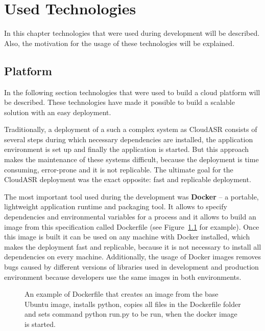 \chapter{Used Technologies}\label{sec:technologies}
In this chapter technologies that were used during development will be described.
Also, the motivation for the usage of these technologies will be explained.

\section{Platform}
In the following section technologies that were used to build a cloud platform will be described.
These technologies have made it possible to build a scalable solution with an easy deployment.

Traditionally, a deployment of a such a complex system as CloudASR consists of several steps
  during which necessary dependencies are installed,
  the application environment is set up
  and finally the application is started.
But this approach makes the maintenance of these systems difficult,
  because the deployment is time consuming, error-prone and it is not replicable.
The ultimate goal for the CloudASR deployment was the exact opposite: fast and replicable deployment.

The most important tool used during the development was \textbf{Docker} \cite{merkel2014docker}
  -- a portable, lightweight application runtime and packaging tool.
It allows to specify dependencies and environmental variables for a process
  and it allows to build an image from this specification called Dockerfile
  (see Figure~\ref{fig:dockerfile} for example).
Once this image is built it can be used on any machine with Docker installed,
  which makes the deployment fast and replicable,
  because it is not necessary to install all dependencies on every machine.
Additionally, the usage of Docker images removes bugs caused by different versions of libraries used in development and production environment
  because developers use the same images in both environments.

\begin{figure}[h]
  

  \caption{
    An example of Dockerfile that creates an image from the base Ubuntu image,
      installs python,
      copies all files in the Dockerfile folder
      and sets command python run.py to be run,
        when the docker image is started.
  }
  \label{fig:dockerfile}
\end{figure}


